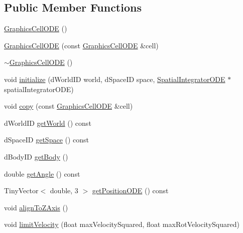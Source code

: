 \subsection*{\-Public \-Member \-Functions}
\begin{DoxyCompactItemize}
\item 
\hyperlink{class_graphics_cell_o_d_e_a62316d8bfd6011407f62c78f4530e415}{\-Graphics\-Cell\-O\-D\-E} ()
\item 
\hyperlink{class_graphics_cell_o_d_e_aa11de20bcd4975c8066adb71afa02d74}{\-Graphics\-Cell\-O\-D\-E} (const \hyperlink{class_graphics_cell_o_d_e}{\-Graphics\-Cell\-O\-D\-E} \&cell)
\item 
\hyperlink{class_graphics_cell_o_d_e_a77528d47f270929cc50f75226e36df5d}{$\sim$\-Graphics\-Cell\-O\-D\-E} ()
\item 
void \hyperlink{class_graphics_cell_o_d_e_a5ed31da765f83ab4d0803d3181564867}{initialize} (d\-World\-I\-D world, d\-Space\-I\-D space, \hyperlink{class_spatial_integrator_o_d_e}{\-Spatial\-Integrator\-O\-D\-E} $\ast$spatial\-Integrator\-O\-D\-E)
\item 
void \hyperlink{class_graphics_cell_o_d_e_acbba71e955bd7b7f1c23776073285121}{copy} (const \hyperlink{class_graphics_cell_o_d_e}{\-Graphics\-Cell\-O\-D\-E} \&cell)
\item 
d\-World\-I\-D \hyperlink{class_graphics_cell_o_d_e_a56cb145cb7f9835601de35fbe90c5719}{get\-World} () const 
\item 
d\-Space\-I\-D \hyperlink{class_graphics_cell_o_d_e_aff5270931c0b33a6be68171c9e565f6d}{get\-Space} () const 
\item 
d\-Body\-I\-D \hyperlink{class_graphics_cell_o_d_e_a30c7bb1b68d60a97b910186785510751}{get\-Body} ()
\item 
double \hyperlink{class_graphics_cell_o_d_e_a74aba3f28026f3ac58e19c92d26b170b}{get\-Angle} () const 
\item 
\-Tiny\-Vector$<$ double, 3 $>$ \hyperlink{class_graphics_cell_o_d_e_a1c3da62e9a9c096155a4dcc23e4686fa}{get\-Position\-O\-D\-E} () const 
\item 
void \hyperlink{class_graphics_cell_o_d_e_a799fbb19bd9fd536df75a9783539afc0}{align\-To\-Z\-Axis} ()
\item 
void \hyperlink{class_graphics_cell_o_d_e_aa895e22390a23f83ad33579a8440661e}{limit\-Velocity} (float max\-Velocity\-Squared, float max\-Rot\-Velocity\-Squared)
\end{DoxyCompactItemize}
